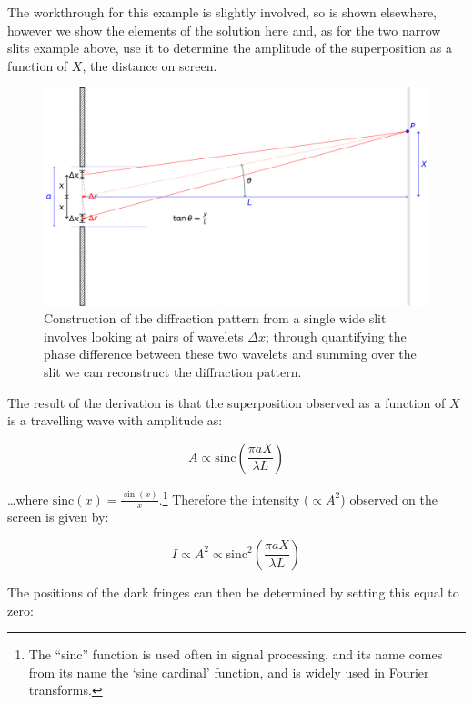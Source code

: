 \documentclass[
]{book}
\begin{document}
The workthrough for this example is slightly involved, so is shown elsewhere, however we show the elements of the solution here and, as for the two narrow slits example above, use it to determine the amplitude of the superposition as a function of \(X\), the distance on screen.

\begin{figure}

{\centering \includegraphics[width=0.7\linewidth]{visualisations/LaTeX/ch13-singlewideslit2b} 

}

\caption{Construction of the diffraction pattern from a single wide slit involves looking at pairs of wavelets $\Delta x$; through quantifying the phase difference between these two wavelets and summing over the slit we can reconstruct the diffraction pattern.}\label{fig:ch13-singlewideslit2}
\end{figure}

The result of the derivation is that the superposition observed as a function of \(X\) is a travelling wave with amplitude as:

\begin{equation}
A \propto \mathrm{sinc}\left(\frac{\pi a X}{\lambda L}\right)
\end{equation}

\ldots where \(\mathrm{sinc}(x) = \frac{\sin (x)}{x}\).\footnote{The ``sinc'' function is used often in signal processing, and its name comes from its name the `sine cardinal' function, and is widely used in Fourier transforms.} Therefore the intensity (\(\propto A^2\)) observed on the screen is given by:

\begin{equation}
I \propto A^2 \propto \mathrm{sinc}^2 \left(\frac{\pi a X}{\lambda L}\right)
\label{eq:ch13-singlewideslit1}
\end{equation}

The positions of the dark fringes can then be determined by setting this equal to zero:
\end{document}
